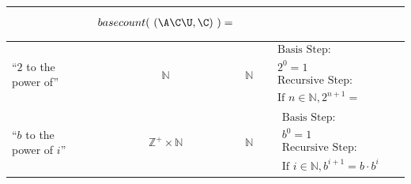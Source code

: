 \begin{center}
\begin{tabular}{p{0.65in}ccp{2.4in}p{2.4in}}
{\begin{align*}
    \end{align*}} & 
    {\begin{align*}
        basecount(~(\A\C\U, \C)~) = 
    \end{align*}}\\
\hline
``$2$ to the power of''& $\mathbb{N}$ & $\mathbb{N}$ & 
{\begin{align*}    
&\textrm{Basis Step:} \\
&2^0= 1 \\
&\textrm{Recursive Step:}\\
&\textrm{If } n \in \mathbb{N}, 2^{n+1} = \phantom{2 \cdot 2^n}
\end{align*}}\\
\hline
``$b$ to the power of $i$''& $\mathbb{Z}^+ \times \mathbb{N}$ & $\mathbb{N}$ & 
{\begin{align*}    
&\textrm{Basis Step:} \\
&b^0 = 1 \\
&\textrm{Recursive Step:}\\
&\textrm{If } i \in \mathbb{N}, b^{i+1} = b \cdot b^i
\end{align*}}
\end{tabular}
\end{center}

\newpage
